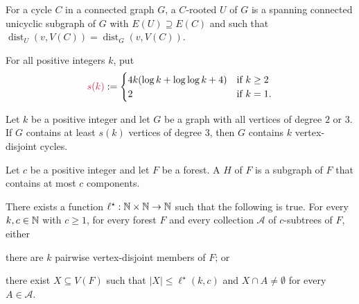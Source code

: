 \documentclass{patmorin}
\DeclareMathOperator{\dist}{dist}
\begin{document}
For a cycle $C$ in a connected graph $G$, a $C$-rooted  $U$ of $G$ is a spanning connected unicyclic subgraph of $G$ with $E(U)\supseteq E(C)$ and such that $\dist_U(v,V(C))=\dist_G(v,V(C))$.

For all positive integers $k$, put
\[
\mathdefin{s(k)}:=\begin{cases}
4k(\log k + \log\log k +4)&\textrm{if $k\geq2$}\\
2&\textrm{if $k=1$.}
\end{cases}
\]
\begin{thm}
\label{thm:simonovits}
Let $k$ be a positive integer and
let $G$ be a graph with all vertices of degree $2$ or $3$.
If $G$ contains at least $s(k)$ vertices of degree $3$, then
$G$ contains $k$ vertex-disjoint cycles.
\end{thm}

Let $c$ be a positive integer and let $F$ be a forest. 
A  $H$ of $F$ is a subgraph of $F$ that contains at most $c$ components.
\begin{thm}\label{thm:gyarfas-lehel-general}
   There exists a function $\ell^\star:\mathbb{N}\times\mathbb{N}\to\mathbb{N}$ such that the following is true. For every $k,c\in\mathbb{N}$ with $c\geq1$, for every forest $F$ and 
    every collection $\mathcal{A}$ of $c$-subtrees of $F$, either
   \begin{compactenum}[(a)]
     \item there are $k$ pairwise vertex-disjoint members of $F$; or
     \item there exist $X \subseteq V(F)$ such that 
     $|X|\leq \ell^\star(k,c)$ and 
     $X\cap A\neq\emptyset$ for every $A\in\mathcal{A}$. 
   \end{compactenum}
\end{thm}
\end{document}
